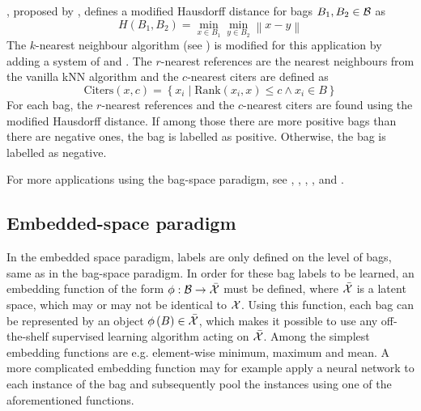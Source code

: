 , proposed by \cite{wang_solving_2000}, defines a modified Hausdorff distance for bags \( B_1, B_2 \in \mathcal{B} \) as
\[ H \left( B_1, B_2 \right) = \min_{x \in B_1} \min_{y \in B_2} \left\lVert x - y \right\rVert \]
The \( k \)-nearest neighbour algorithm (see \cite{dasarathy_nearest_1991}) is modified for this application by adding a system of  and . The \( r \)-nearest references are the nearest neighbours from the vanilla kNN algorithm and the \( c \)-nearest citers are defined as
\[ \mathrm{Citers} \left( x, c \right) = \left\{ x_i \middle| \mathrm{Rank} \left( x_i, x \right) \leq c \wedge x_i \in B \right\} \]
For each bag, the \( r \)-nearest references and the \( c \)-nearest citers are found using the modified Hausdorff distance. If among those there are more positive bags than there are negative ones, the bag is labelled as positive. Otherwise, the bag is labelled as negative.

For more applications using the bag-space paradigm, see \cite{wang_solving_2000}, \cite{kwok_marginalized_2007}, \cite{gartner_multi-instance_2002}, \cite{haussler_convolution_1999}, \cite{zhou_multi-instance_2009} and \cite{muandet_learning_2012}.

\subsection{Embedded-space paradigm}\label{sec:embedded-space-paradigm}
In the embedded space paradigm, labels are only defined on the level of bags, same as in the bag-space paradigm. In order for these bag labels to be learned, an embedding function of the form \( \phi : \mathcal{B} \to \bar{\mathcal{X}} \) must be defined, where \( \bar{\mathcal{X}} \) is a latent space, which may or may not be identical to \( \mathcal{X} \). Using this function, each bag can be represented by an object \( \phi \left( B \right) \in \bar{\mathcal{X}} \), which makes it possible to use any off-the-shelf supervised learning algorithm acting on \( \bar{\mathcal{X}} \). Among the simplest embedding functions are e.g. element-wise minimum, maximum and mean. A more complicated embedding function may for example apply a neural network to each instance of the bag and subsequently pool the instances using one of the aforementioned functions.

